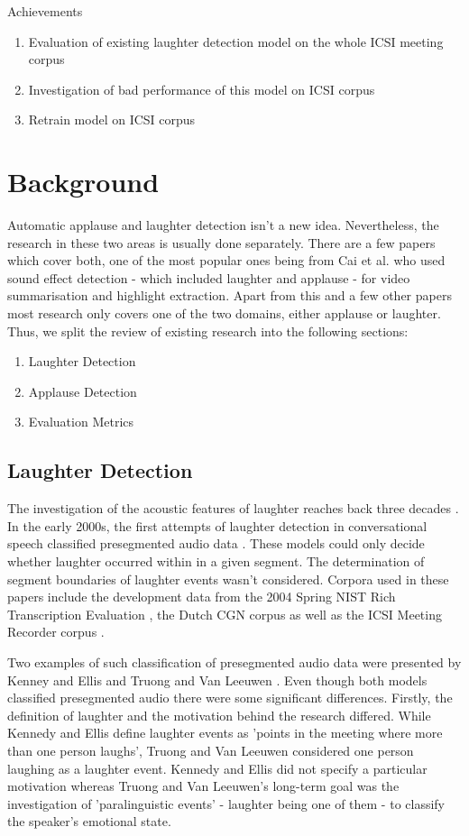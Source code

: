 \documentclass[bsc,frontabs,parskip,deptreport]{infthesis}
\begin{document}
Achievements
\begin{enumerate}
  \item Evaluation of existing laughter detection model on the whole ICSI meeting corpus
  \item Investigation of bad performance of this model on ICSI corpus
  \item Retrain model on ICSI corpus
\end{enumerate}

\chapter{Background} \label{cha:bg}
Automatic applause and laughter detection isn't a new idea. Nevertheless, the research in these two areas is usually done separately. There are a few papers which cover both, one of the most popular ones being from Cai et al. \citep{cai2003highlight} who used sound effect detection - which included laughter and applause - for video summarisation and highlight extraction.
Apart from this and a few other papers most research only covers one of the two domains, either applause or laughter. Thus, we split the review of existing research into the following sections:
\begin{enumerate}
  \item Laughter Detection
  \item Applause Detection
  \item Evaluation Metrics 
\end{enumerate}


\section{Laughter Detection} \label{sec:bg-laughter}
The investigation of the acoustic features of laughter reaches back three decades \citep{bickley1992acoustic}.
In the early 2000s, the first attempts of laughter detection in conversational speech classified presegmented audio data \citep{kennedy2004laughter, truong2005automatic}. These models could only decide whether laughter occurred within in a given segment. The determination of segment boundaries of laughter events wasn't considered. 
Corpora used in these papers include the development data from the 2004 Spring NIST Rich Transcription Evaluation \citep{ldcnistcorpus}, the Dutch CGN corpus \citep{oostdijk2000spoken} as well as the ICSI Meeting Recorder corpus \citep{morgan2001meeting}. 

Two examples of such classification of presegmented audio data were presented by Kenney and Ellis \citep{kennedy2004laughter} and Truong and Van Leeuwen \citep{truong2005automatic}. 
Even though both models classified presegmented audio there were some significant differences. 
Firstly, the definition of laughter and the motivation behind the research differed.
While Kennedy and Ellis define laughter events as 'points in the meeting where more than one person laughs', Truong and Van Leeuwen considered one person laughing as a laughter event.
Kennedy and Ellis did not specify a particular motivation whereas Truong and Van Leeuwen's long-term goal was the investigation of 'paralinguistic events' - laughter being one of them - to classify the speaker's emotional state.   
\end{document}
